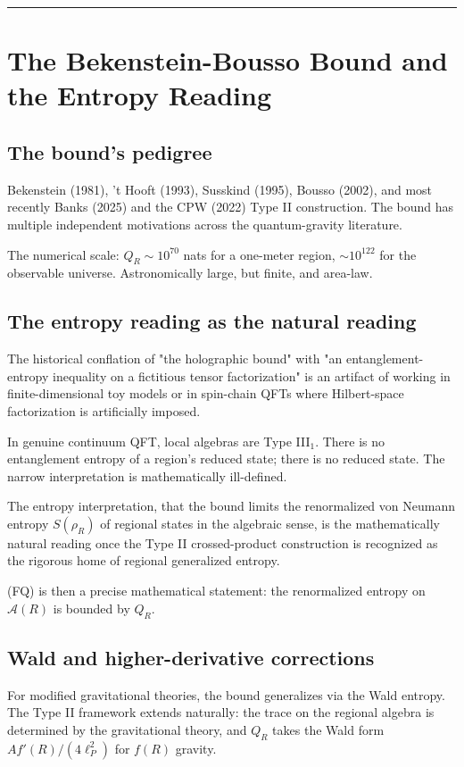 \documentclass[11pt,a4paper]{article}
\begin{document}
\medskip\hrule\medskip

\section{The Bekenstein-Bousso Bound and the Entropy Reading}

\subsection{The bound's pedigree}

Bekenstein (1981), 't Hooft (1993), Susskind (1995), Bousso (2002), and most recently Banks (2025) and the CPW (2022) Type II construction. The bound has multiple independent motivations across the quantum-gravity literature.

The numerical scale: $Q_R \sim 10^{70}$ nats for a one-meter region, $\sim 10^{122}$ for the observable universe. Astronomically large, but finite, and area-law.

\subsection{The entropy reading as the natural reading}

The historical conflation of "the holographic bound" with "an entanglement-entropy inequality on a fictitious tensor factorization" is an artifact of working in finite-dimensional toy models or in spin-chain QFTs where Hilbert-space factorization is artificially imposed.

In genuine continuum QFT, local algebras are Type III$_1$. There is no entanglement entropy of a region's reduced state; there is no reduced state. The narrow interpretation is mathematically ill-defined.

The entropy interpretation, that the bound limits the renormalized von Neumann entropy $S(\rho_R)$ of regional states in the algebraic sense, is the mathematically natural reading once the Type II crossed-product construction is recognized as the rigorous home of regional generalized entropy.

(FQ) is then a precise mathematical statement: the renormalized entropy on $\hat{\mathcal{A}}(R)$ is bounded by $Q_R$.

\subsection{Wald and higher-derivative corrections}

For modified gravitational theories, the bound generalizes via the Wald entropy. The Type II framework extends naturally: the trace on the regional algebra is determined by the gravitational theory, and $Q_R$ takes the Wald form $A f'(R)/(4\ell_P^2)$ for $f(R)$ gravity.
\end{document}
